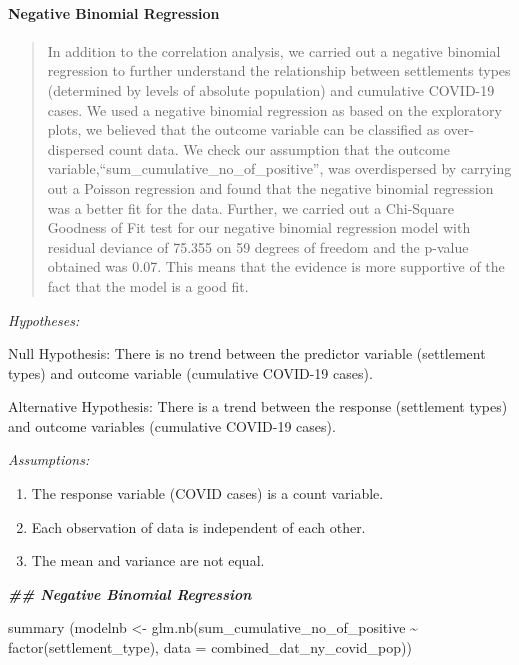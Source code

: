 \documentclass[
  12pt,
]{article}
\newenvironment{Shaded}{\begin{snugshade}}{\end{snugshade}}
\newcommand{\AttributeTok}[1]{\textcolor[rgb]{0.77,0.63,0.00}{#1}}
\newcommand{\DocumentationTok}[1]{\textcolor[rgb]{0.56,0.35,0.01}{\textbf{\textit{#1}}}}
\newcommand{\FunctionTok}[1]{\textcolor[rgb]{0.00,0.00,0.00}{#1}}
\newcommand{\NormalTok}[1]{#1}
\newcommand{\OtherTok}[1]{\textcolor[rgb]{0.56,0.35,0.01}{#1}}
\newcommand{\SpecialCharTok}[1]{\textcolor[rgb]{0.00,0.00,0.00}{#1}}
\providecommand{\tightlist}{%
  \setlength{\itemsep}{0pt}\setlength{\parskip}{0pt}}
\begin{document}
\hypertarget{negative-binomial-regression}{%
\paragraph{Negative Binomial
Regression}\label{negative-binomial-regression}}

\begin{quote}
In addition to the correlation analysis, we carried out a negative
binomial regression to further understand the relationship between
settlements types (determined by levels of absolute population) and
cumulative COVID-19 cases. We used a negative binomial regression as
based on the exploratory plots, we believed that the outcome variable
can be classified as over-dispersed count data. We check our assumption
that the outcome variable,``sum\_cumulative\_no\_of\_positive'', was
overdispersed by carrying out a Poisson regression and found that the
negative binomial regression was a better fit for the data. Further, we
carried out a Chi-Square Goodness of Fit test for our negative binomial
regression model with residual deviance of 75.355 on 59 degrees of
freedom and the p-value obtained was 0.07. This means that the evidence
is more supportive of the fact that the model is a good fit.
\end{quote}

\emph{Hypotheses:}

Null Hypothesis: There is no trend between the predictor variable
(settlement types) and outcome variable (cumulative COVID-19 cases).

Alternative Hypothesis: There is a trend between the response
(settlement types) and outcome variables (cumulative COVID-19 cases).

\emph{Assumptions:}

\begin{enumerate}
\def\labelenumi{\arabic{enumi}.}
\tightlist
\item
  The response variable (COVID cases) is a count variable.
\item
  Each observation of data is independent of each other.
\item
  The mean and variance are not equal.
\end{enumerate}

\begin{Shaded}
\begin{Highlighting}[]
\DocumentationTok{\#\# Negative Binomial Regression}

\FunctionTok{summary}\NormalTok{ (modelnb }\OtherTok{\textless{}{-}} \FunctionTok{glm.nb}\NormalTok{(sum\_cumulative\_no\_of\_positive }\SpecialCharTok{\textasciitilde{}} \FunctionTok{factor}\NormalTok{(settlement\_type), }\AttributeTok{data =}\NormalTok{ combined\_dat\_ny\_covid\_pop))}
\end{Highlighting}
\end{Shaded}
\end{document}
